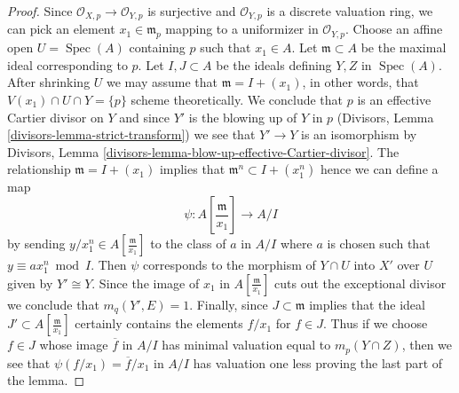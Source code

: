 \documentclass[10pt,a4paper]{amsart}
\theoremstyle{plain}
\theoremstyle{definition}
\theoremstyle{remark}
\numberwithin{equation}{subsection}
\def\Spec{\mathop{\mathrm{Spec}}}
\begin{document}
\begin{proof}
Since $\mathcal{O}_{X, p} \to \mathcal{O}_{Y, p}$ is surjective and
$\mathcal{O}_{Y, p}$ is a discrete valuation ring, we can pick an
element $x_1 \in \mathfrak m_p$ mapping to a uniformizer in
$\mathcal{O}_{Y, p}$. Choose an affine open $U = \Spec(A)$ containing
$p$ such that $x_1 \in A$. Let $\mathfrak m \subset A$ be the
maximal ideal corresponding to $p$. Let $I, J \subset A$
be the ideals defining $Y, Z$ in $\Spec(A)$. After shrinking $U$
we may assume that $\mathfrak m = I + (x_1)$, in other words,
that $V(x_1) \cap U \cap Y = \{p\}$ scheme theoretically.
We conclude that $p$ is an effective Cartier divisor on $Y$ and
since $Y'$ is the blowing up of $Y$ in $p$
(Divisors, Lemma \ref{divisors-lemma-strict-transform})
we see that $Y' \to Y$ is an isomorphism by
Divisors, Lemma \ref{divisors-lemma-blow-up-effective-Cartier-divisor}.
The relationship $\mathfrak m = I + (x_1)$ implies that
$\mathfrak m^n \subset I + (x_1^n)$ hence we can define a map
$$
\psi : A[\textstyle{\frac{\mathfrak m}{x_1}}] \longrightarrow A/I
$$
by sending $y/x_1^n \in A[\frac{\mathfrak m}{x_1}]$
to the class of $a$ in $A/I$ where $a$
is chosen such that $y \equiv ax_1^n \bmod I$.
Then $\psi$ corresponds to the morphism of $Y \cap U$ into $X'$
over $U$ given by $Y' \cong Y$. Since the image of $x_1$
in $A[\frac{\mathfrak m}{x_1}]$ cuts out the exceptional divisor
we conclude that $m_q(Y', E) = 1$. Finally, since
$J \subset \mathfrak m$ implies that the ideal
$J' \subset A[\frac{\mathfrak m}{x_1}]$ certainly
contains the elements $f/x_1$ for $f \in J$.
Thus if we choose $f \in J$ whose image $\overline{f}$ in $A/I$ has
minimal valuation equal to $m_p(Y \cap Z)$, then we see that
$\psi(f/x_1) = \overline{f}/x_1$ in $A/I$ has valuation one less
proving the last part of the lemma.
\end{proof}
\end{document}
